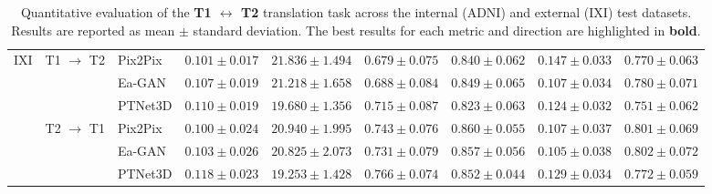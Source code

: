 \documentclass[11pt,a4paper]{article}
\begin{document}
\begin{table}[H]
{\begin{tabular}{lllcccccc}
\multirow{6}{*}{IXI} 
    & \multirow{3}{*}{T1 $\rightarrow$ T2} 
                & Pix2Pix & $\mathbf{0.101 \pm 0.017}$ & $\mathbf{21.836 \pm 1.494}$ & $0.679 \pm 0.075$ & $0.840 \pm 0.062$ & $0.147 \pm 0.033$ & $0.770 \pm 0.063$ \\
    &           & Ea-GAN  & $0.107 \pm 0.019$ & $21.218 \pm 1.658$ & $0.688 \pm 0.084$ & $\mathbf{0.849 \pm 0.065}$ & $\mathbf{0.107 \pm 0.034}$ & $\mathbf{0.780 \pm 0.071}$ \\
    &           & PTNet3D & $0.110 \pm 0.019$ & $19.680 \pm 1.356$ & $\mathbf{0.715 \pm 0.087}$ & $0.823 \pm 0.063$ & $0.124 \pm 0.032$ & $0.751 \pm 0.062$ \\
\cline{2-9}\noalign{\smallskip}
    & \multirow{3}{*}{T2 $\rightarrow$ T1} 
                & Pix2Pix & $\mathbf{0.100 \pm 0.024}$ & $\mathbf{20.940 \pm 1.995}$ & $0.743 \pm 0.076$ & $\mathbf{0.860 \pm 0.055}$ & $0.107 \pm 0.037$ & $0.801 \pm 0.069$ \\
    &           & Ea-GAN  & $0.103 \pm 0.026$ & $20.825 \pm 2.073$ & $0.731 \pm 0.079$ & $0.857 \pm 0.056$ & $\mathbf{0.105 \pm 0.038}$ & $\mathbf{0.802 \pm 0.072}$ \\
    &           & PTNet3D & $0.118 \pm 0.023$ & $19.253 \pm 1.428$ & $\mathbf{0.766 \pm 0.074}$ & $0.852 \pm 0.044$ & $0.129 \pm 0.034$ & $0.772 \pm 0.059$ \\
\hline\hline

\end{tabular}%
}
\vspace{2mm}
\caption{Quantitative evaluation of the \textbf{T1 $\leftrightarrow$ T2} translation task across the internal (ADNI) and external (IXI) test datasets. Results are reported as mean $\pm$ standard deviation. The best results for each metric and direction are highlighted in \textbf{bold}.}
\label{tab:results_t1_t2_full}
\end{table}
\end{document}
